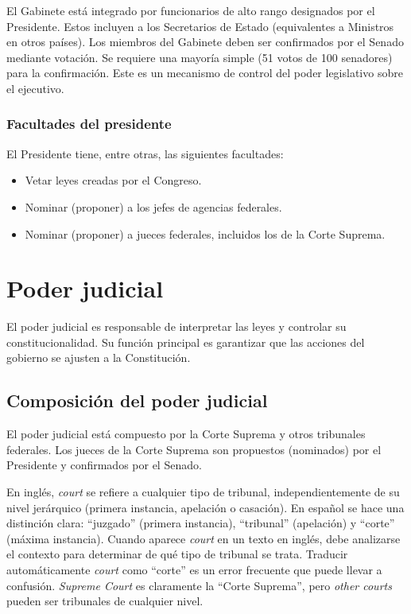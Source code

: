 \documentclass[12pt,oneside]{book}
\begin{document}
El Gabinete está integrado por funcionarios de alto rango designados por el Presidente. Estos incluyen a los Secretarios de Estado (equivalentes a Ministros en otros países). Los miembros del Gabinete deben ser confirmados por el Senado mediante votación. Se requiere una mayoría simple (51 votos de 100 senadores) para la confirmación. Este es un mecanismo de control del poder legislativo sobre el ejecutivo.

\subsection{Facultades del presidente}

El Presidente tiene, entre otras, las siguientes facultades:

\begin{itemize}
    \item Vetar leyes creadas por el Congreso.
    \item Nominar (proponer) a los jefes de agencias federales.
    \item Nominar (proponer) a jueces federales, incluidos los de la Corte Suprema.
\end{itemize}

\chapter{Poder judicial}

El poder judicial es responsable de interpretar las leyes y controlar su constitucionalidad. Su función principal es garantizar que las acciones del gobierno se ajusten a la Constitución.

\section{Composición del poder judicial}

El poder judicial está compuesto por la Corte Suprema y otros tribunales federales. Los jueces de la Corte Suprema son propuestos (nominados) por el Presidente y confirmados por el Senado.

\begin{important}
En inglés, \textit{court} se refiere a cualquier tipo de tribunal, independientemente de su nivel jerárquico (primera instancia, apelación o casación). En español se hace una distinción clara: ``juzgado'' (primera instancia), ``tribunal'' (apelación) y ``corte'' (máxima instancia). Cuando aparece \textit{court} en un texto en inglés, debe analizarse el contexto para determinar de qué tipo de tribunal se trata. Traducir automáticamente \textit{court} como ``corte'' es un error frecuente que puede llevar a confusión. \textit{Supreme Court} es claramente la ``Corte Suprema'', pero \textit{other courts} pueden ser tribunales de cualquier nivel.
\end{important}
\end{document}
